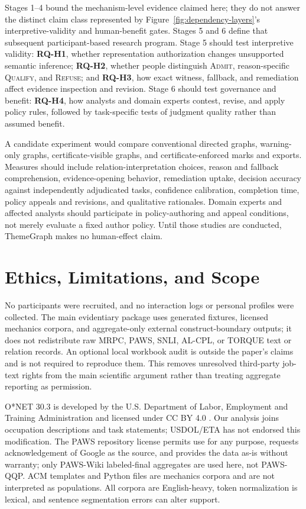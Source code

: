 \documentclass[manuscript,screen,review,anonymous]{acmart}
\begin{document}
Stages 1--4 bound the mechanism-level evidence claimed here; they do not answer the distinct claim class represented by Figure~\ref{fig:dependency-layers}'s interpretive-validity and human-benefit gates. Stages 5 and 6 define that subsequent participant-based research program. Stage 5 should test interpretive validity: \textbf{RQ-H1}, whether representation authorization changes unsupported semantic inference; \textbf{RQ-H2}, whether people distinguish \textsc{Admit}, reason-specific \textsc{Qualify}, and \textsc{Refuse}; and \textbf{RQ-H3}, how exact witness, fallback, and remediation affect evidence inspection and revision. Stage 6 should test governance and benefit: \textbf{RQ-H4}, how analysts and domain experts contest, revise, and apply policy rules, followed by task-specific tests of judgment quality rather than assumed benefit.

A candidate experiment would compare conventional directed graphs, warning-only graphs, certificate-visible graphs, and certificate-enforced marks and exports. Measures should include relation-interpretation choices, reason and fallback comprehension, evidence-opening behavior, remediation uptake, decision accuracy against independently adjudicated tasks, confidence calibration, completion time, policy appeals and revisions, and qualitative rationales. Domain experts and affected analysts should participate in policy-authoring and appeal conditions, not merely evaluate a fixed author policy. Until those studies are conducted, ThemeGraph makes no human-effect claim.

\section{Ethics, Limitations, and Scope}

No participants were recruited, and no interaction logs or personal profiles were collected. The main evidentiary package uses generated fixtures, licensed mechanics corpora, and aggregate-only external construct-boundary outputs; it does not redistribute raw MRPC, PAWS, SNLI, AL-CPL, or TORQUE text or relation records. An optional local workbook audit is outside the paper's claims and is not required to reproduce them. This removes unresolved third-party job-text rights from the main scientific argument rather than treating aggregate reporting as permission.

O*NET 30.3 is developed by the U.S. Department of Labor, Employment and Training Administration and licensed under CC BY 4.0 \cite{onet303}. Our analysis joins occupation descriptions and task statements; USDOL/ETA has not endorsed this modification. The PAWS repository license permits use for any purpose, requests acknowledgement of Google as the source, and provides the data as-is without warranty; only PAWS-Wiki labeled-final aggregates are used here, not PAWS-QQP. ACM templates and Python files are mechanics corpora and are not interpreted as populations. All corpora are English-heavy, token normalization is lexical, and sentence segmentation errors can alter support.
\end{document}

